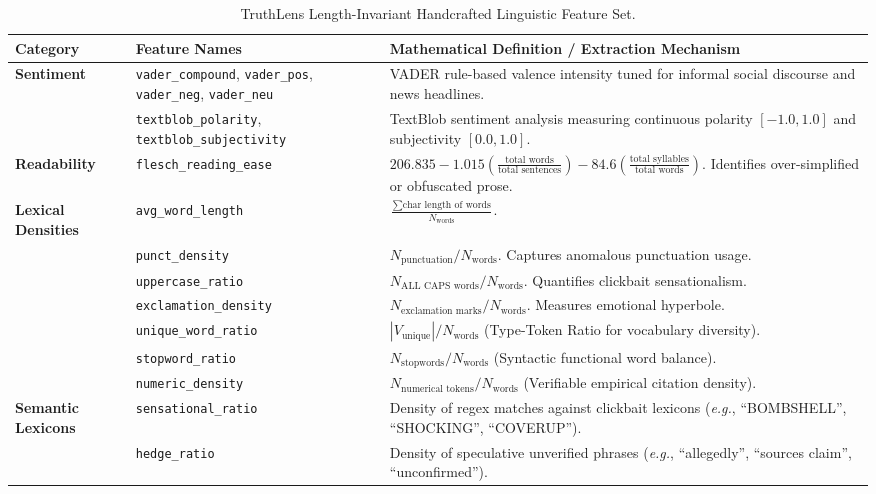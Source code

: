 \documentclass[11pt,a4paper]{article}
\begin{document}
\begin{table}[htbp]
\centering
\small
\begin{tabularx}{\textwidth}{l p{3.2cm} X}
\toprule
\textbf{Category} & \textbf{Feature Names} & \textbf{Mathematical Definition / Extraction Mechanism} \\
\midrule
\textbf{Sentiment} & \texttt{vader\_compound}, \texttt{vader\_pos}, \texttt{vader\_neg}, \texttt{vader\_neu} & VADER rule-based valence intensity tuned for informal social discourse and news headlines. \\
& \texttt{textblob\_polarity}, \texttt{textblob\_subjectivity} & TextBlob sentiment analysis measuring continuous polarity $[-1.0, 1.0]$ and subjectivity $[0.0, 1.0]$. \\
\midrule
\textbf{Readability} & \texttt{flesch\_reading\_ease} & $206.835 - 1.015 \left(\frac{\text{total words}}{\text{total sentences}}\right) - 84.6 \left(\frac{\text{total syllables}}{\text{total words}}\right)$. Identifies over-simplified or obfuscated prose. \\
\midrule
\textbf{Lexical Densities} & \texttt{avg\_word\_length} & $\frac{\sum \text{char length of words}}{N_{\text{words}}}$. \\
& \texttt{punct\_density} & $N_{\text{punctuation}} / N_{\text{words}}$. Captures anomalous punctuation usage. \\
& \texttt{uppercase\_ratio} & $N_{\text{ALL CAPS words}} / N_{\text{words}}$. Quantifies clickbait sensationalism. \\
& \texttt{exclamation\_density} & $N_{\text{exclamation marks}} / N_{\text{words}}$. Measures emotional hyperbole. \\
& \texttt{unique\_word\_ratio} & $|V_{\text{unique}}| / N_{\text{words}}$ (Type-Token Ratio for vocabulary diversity). \\
& \texttt{stopword\_ratio} & $N_{\text{stopwords}} / N_{\text{words}}$ (Syntactic functional word balance). \\
& \texttt{numeric\_density} & $N_{\text{numerical tokens}} / N_{\text{words}}$ (Verifiable empirical citation density). \\
\midrule
\textbf{Semantic Lexicons} & \texttt{sensational\_ratio} & Density of regex matches against clickbait lexicons (\textit{e.g.}, ``BOMBSHELL'', ``SHOCKING'', ``COVERUP''). \\
& \texttt{hedge\_ratio} & Density of speculative unverified phrases (\textit{e.g.}, ``allegedly'', ``sources claim'', ``unconfirmed''). \\
\bottomrule
\end{tabularx}
\caption{TruthLens Length-Invariant Handcrafted Linguistic Feature Set.}
\label{tab:features}
\end{table}
\end{document}
